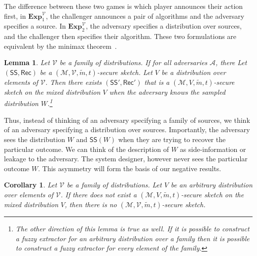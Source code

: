 \documentclass[11pt]{article}
\newcommand{\class}[1]{{\ensuremath{\mathsf{#1}}}}
\newcommand{\sketch}{\ensuremath{\class{SS}}\xspace}
\newcommand{\rec}{\ensuremath{\class{Rec}}\xspace}
\newtheorem{lemma}[theorem]{Lemma}
\newtheorem{corollary}[theorem]{Corollary}
\newcommand{\Exp}{\mathbf{Exp}}
\begin{document}

The difference between these two games is which player announces their action first, in $\Exp^{\mathcal{V}}_1$, the challenger announces a pair of algorithms and the adversary specifies a source.  In $\Exp^{\mathcal{V}}_2$, the adversary specifies a distribution over sources, and the challenger then specifies their algorithm.  These two formulations are equivalent by the minimax theorem~\cite{neumann1928theorie}.

\begin{lemma}
\label{lem:quant switch fuzz}
Let $\mathcal{V}$ be a family of distributions.  If for all adversaries $\mathcal{A}$, there Let $(\sketch, \rec)$ be a $(\mathcal{M}, \mathcal{V}, \tilde{m}, t)$-secure sketch.  Let $V$ be a distribution over elements of $\mathcal{V}$.  Then there exists $(\sketch', \rec')$ that is a $(\mathcal{M}, V, \tilde{m}, t)$-secure sketch on the mixed distribution $V$ when the adversary knows the sampled distribution $W$.\footnote{The other direction of this lemma is true as well.  If it is possible to construct a fuzzy extractor for an arbitrary distribution over a family then it is possible to construct a fuzzy extractor for every element of the family.}
\end{lemma}

Thus, instead of thinking of an adversary specifying a family of sources, we think of an adversary specifying a distribution over sources.  Importantly, the adversary sees the distribution $W$ and $\sketch(W)$ when they are trying to recover the particular outcome.  We can think of the description of $W$ as side-information or leakage to the adversary.  The system designer, however never sees the particular outcome $W$.  This asymmetry will form the basis of our negative results.

\begin{corollary}
\label{cor:no fuzz for dist}
Let $\mathcal{V}$ be a family of distributions.  Let $V$ be an arbitrary distribution over elements of $\mathcal{V}$.  If there does not exist a $(\mathcal{M}, V, \tilde{m}, t)$-secure sketch on the mixed distribution $V$, then there is no $(\mathcal{M}, \mathcal{V}, \tilde{m}, t)$-secure sketch.
\end{corollary}
\end{document}
